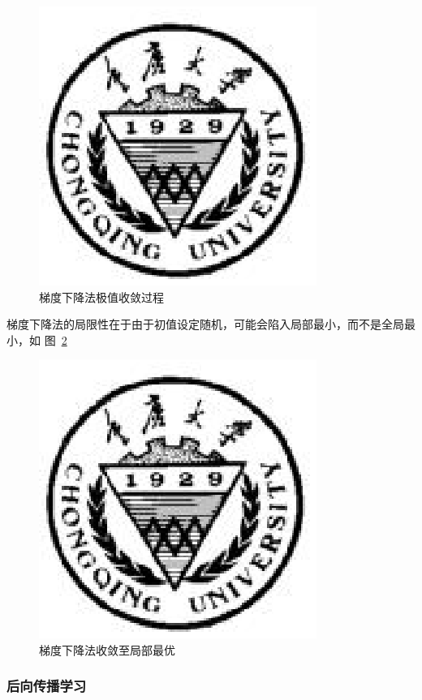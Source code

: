\documentclass[bachelor,zhspacing]{cqu}  %
\begin{document}
\begin{figure}[htbp]
\centering
\includegraphics{./pic/cqu.eps}
\caption{梯度下降法极值收敛过程}\label{fig:mlp-grad-1}
\end{figure}

梯度下降法的局限性在于由于初值设定随机，可能会陷入局部最小，而不是全局最小，如
图~\ref{fig:mlp-grad-2}

\begin{figure}[htbp]
\centering
\includegraphics{./pic/cqu.eps}
\caption{梯度下降法收敛至局部最优}\label{fig:mlp-grad-2}
\end{figure}

\subsubsection{后向传播学习}\label{ux540eux5411ux4f20ux64adux5b66ux4e60}
\end{document}
